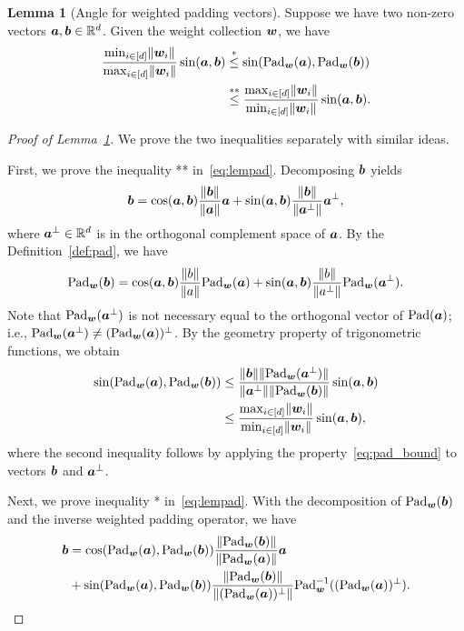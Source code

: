 \documentclass[journal]{IEEEtran}
\theoremstyle{definition}
\newtheorem{lem}{Lemma}
\theoremstyle{definition}
\begin{document}
\begin{lem}[Angle for weighted padding vectors]\label{lem:pad} Suppose we have two non-zero vectors $\bm{a}, \bm{b} \in \mathbb{R}^d$. Given the weight collection $\bm{w}$, we have 
\begin{align}
    \frac{\min_{i \in [d]} \onormSize{}{\mw_i}}{\max_{i \in [d]} \onormSize{}{\mw_i} } \sin (\ma, \mb) & \stackrel{*}{\leq} \sin(\pad_{\mw}(\ma),  \pad_{\mw}(\mb)) \\
    & \stackrel{**}{\leq} \frac{ \max_{i \in [d]} \onormSize{}{\mw_i} }{\min_{i \in [d]} \onormSize{}{\mw_i}} \sin (\ma, \mb). \label{eq:lempad}
\end{align}
\end{lem}

\begin{proof}[Proof of Lemma~\ref{lem:pad}] We prove the two inequalities separately with similar ideas.

First, we prove the inequality ** in~\eqref{eq:lempad}. Decomposing $\bm{b}$ yields
\begin{equation}
    \bm{b} = \cos (\bm{a}, \bm{b}) \frac{\lVert\bm{b}\rVert}{\lVert\bm{a}\rVert} \bm{a} + \sin (\bm{a}, \bm{b}) \frac{\lVert\bm{b}\rVert}{\lVert\bm{a}^{\perp}\rVert}\bm{a}^{\perp},
\end{equation}
where $\bm{a}^{\perp} \in \mathbb{R}^d$ is in the orthogonal complement space of $\bm{a}$. By the Definition~\ref{def:pad}, we have 
\begin{equation}\label{eq:pad_second_ineq}
    \pad_{\mw}(\mb) = \cos (\ma, \mb) \frac{\onormSize{}{b}}{\onormSize{}{a}} \pad_{\mw}(\ma) + \sin (\ma, \mb) \frac{\onormSize{}{b}}{\onormSize{}{a^{\perp}}} \pad_{\mw}(\ma^{\perp}).
\end{equation}
Note that $\text{Pad}_{\bm{w}}(\bm{a}^{\perp})$ is not necessary equal to the orthogonal vector of $\text{Pad}(\bm{a})$; i.e., $\text{Pad}_{\bm{w}}(\bm{a}^{\perp}) \neq (\text{Pad}_{\bm{w}}(\bm{a}))^{\perp}$. By the geometry property of trigonometric functions, we obtain
\begin{align}
    \sin(\text{Pad}_{\bm{w}}(\bm{a}),  \text{Pad}_{\bm{w}}(\bm{b}))  &\leq \frac{  \lVert\bm{b}\rVert \lVert\text{Pad}_{\bm{w}}(\bm{a}^{\perp})\rVert }{ \lVert\bm{a}^{\perp}\rVert \lVert \text{Pad}_{\bm{w}}(\bm{b})\rVert} \sin (\bm{a}, \bm{b})  \\
    & \leq  \frac{ \max_{i \in [d]} \lVert\bm{w}_i\rVert }{\min_{i \in [d]} \lVert\bm{w}_i\rVert} \sin (\bm{a}, \bm{b}),
\end{align}
where the second inequality follows by applying the property~\eqref{eq:pad_bound} to vectors $\bm{b}$ and $\bm{a}^{\perp}$. 

Next, we prove inequality * in~\eqref{eq:lempad}. With the decomposition of $\text{Pad}_{\bm{w}}(\bm{b})$ and the inverse weighted padding operator, we have 
\small
\begin{align}
    \bm{b} &=  \cos(\text{Pad}_{\bm{w}}(\bm{a}), \text{Pad}_{\bm{w}}(\bm{b})) \frac{\lVert\text{Pad}_{\bm{w}}(\bm{b})\rVert}{\lVert\text{Pad}_{\bm{w}}(\bm{a})\rVert} \bm{a} \\
    & +  \sin(\text{Pad}_{\bm{w}}(\bm{a}), \text{Pad}_{\bm{w}}(\bm{b}))\frac{\lVert\text{Pad}_{\bm{w}}(\bm{b})\rVert}{\lVert(\text{Pad}_{\bm{w}}(\bm{a}))^{\perp}\rVert} \text{Pad}_{\bm{w}}^{-1}((\text{Pad}_{\bm{w}}(\bm{a}))^{\perp}).
\end{align}
\normalsize


\end{proof}
\end{document}
